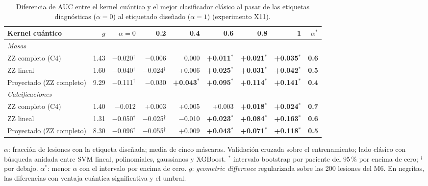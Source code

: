 \begin{table}[H]
\centering
\small
\caption{Diferencia de AUC entre el kernel cuántico y el mejor clasificador clásico al pasar de las etiquetas diagnósticas ($\alpha = 0$) al etiquetado diseñado ($\alpha = 1$) (experimento X11).}
\label{tab:x11_transicion}
\begin{adjustbox}{max width=\linewidth}
\begin{tabular}{l r r r r r r r r}
\toprule
Kernel cuántico & $g$ & $\alpha=0$ & 0.2 & 0.4 & 0.6 & 0.8 & 1 & $\alpha^{*}$ \\
\midrule
\multicolumn{9}{l}{\textit{Masas}} \\
\quad ZZ completo (C4) & 1.43 & $-$0.020$^{\dagger}$ & $-$0.006 & 0.000 & \textbf{\boldmath +0.011$^{*}$} & \textbf{\boldmath +0.021$^{*}$} & \textbf{\boldmath +0.035$^{*}$} & \textbf{0.6} \\
\quad ZZ lineal & 1.60 & $-$0.040$^{\dagger}$ & $-$0.024$^{\dagger}$ & +0.006 & \textbf{\boldmath +0.025$^{*}$} & \textbf{\boldmath +0.031$^{*}$} & \textbf{\boldmath +0.042$^{*}$} & \textbf{0.5} \\
\quad Proyectado (ZZ completo) & 9.29 & $-$0.111$^{\dagger}$ & $-$0.030 & \textbf{\boldmath +0.043$^{*}$} & \textbf{\boldmath +0.095$^{*}$} & \textbf{\boldmath +0.114$^{*}$} & \textbf{\boldmath +0.141$^{*}$} & \textbf{0.4} \\
\multicolumn{9}{l}{\textit{Calcificaciones}} \\
\quad ZZ completo (C4) & 1.40 & $-$0.012 & +0.003 & +0.005 & +0.003 & \textbf{\boldmath +0.018$^{*}$} & \textbf{\boldmath +0.024$^{*}$} & \textbf{0.7} \\
\quad ZZ lineal & 1.31 & $-$0.050$^{\dagger}$ & $-$0.025$^{\dagger}$ & $-$0.010 & \textbf{\boldmath +0.023$^{*}$} & \textbf{\boldmath +0.084$^{*}$} & \textbf{\boldmath +0.163$^{*}$} & \textbf{0.6} \\
\quad Proyectado (ZZ completo) & 8.30 & $-$0.096$^{\dagger}$ & $-$0.055$^{\dagger}$ & +0.009 & \textbf{\boldmath +0.043$^{*}$} & \textbf{\boldmath +0.071$^{*}$} & \textbf{\boldmath +0.118$^{*}$} & \textbf{0.5} \\
\bottomrule
\end{tabular}
\end{adjustbox}
\par\smallskip
\parbox{0.95\linewidth}{\footnotesize $\alpha$: fracción de lesiones con la etiqueta diseñada; media de cinco máscaras. Validación cruzada sobre el entrenamiento; lado clásico con búsqueda anidada entre SVM lineal, polinomiales, gaussianos y XGBoost. $^{*}$ intervalo bootstrap por paciente del 95\,\% por encima de cero; $^{\dagger}$ por debajo. $\alpha^{*}$: menor $\alpha$ con el intervalo por encima de cero. $g$: \textit{geometric difference} regularizada sobre las 200 lesiones del M6. En negritas, las diferencias con ventaja cuántica significativa y el umbral.}
\end{table}
